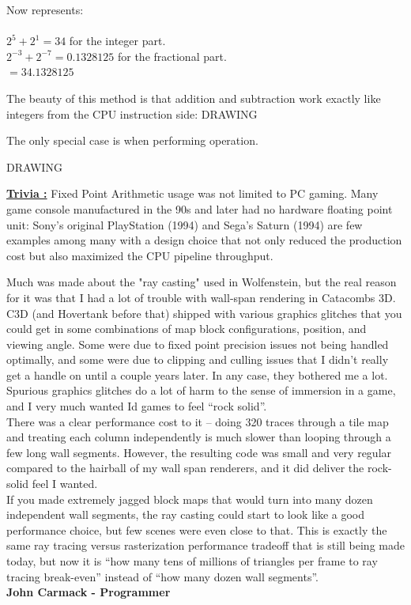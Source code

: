 \documentclass[book.tex]{subfiles}
\begin{document}
Now represents:\\
\\
$ 2^5 + 2^1 = 34 $ for the integer part.\\
$ 2^{-3}+2^{-7} = 0.1328125 $ for the fractional part.\\
$ = 34.1328125$\\

\bigskip

The beauty of this method is that addition and subtraction work exactly like integers from the CPU instruction side:
  \bigskip
  DRAWING
  \bigskip


 The only special case is when performing operation.

\bigskip
  DRAWING
  \bigskip

 \textbf{\underline{Trivia :}}  Fixed Point Arithmetic usage was not limited to PC gaming. Many game console manufactured in the 90s and later had no hardware floating point unit: Sony's original PlayStation (1994) and Sega's Saturn (1994) are few examples among many with a design choice that not only reduced the production cost but also maximized the CPU pipeline throughput.
 
 
 
\begin{fancyquotes}
Much was made about the "ray casting" used in Wolfenstein, but the real reason for it was that I had a lot of trouble with wall-span rendering in Catacombs 3D.  C3D (and Hovertank before that) shipped with various graphics glitches that you could get in some combinations of map block configurations, position, and viewing angle.  Some were due to fixed point precision issues not being handled optimally, and some were due to clipping and culling issues that I didn’t really get a handle on until a couple years later.  In any case, they bothered me a lot.  Spurious graphics glitches do a lot of harm to the sense of immersion in a game, and I very much wanted Id games to feel “rock solid”.
 \bigskip \\
There was a clear performance cost to it – doing 320 traces through a tile map and treating each column independently is much slower than looping through a few long wall segments.  However, the resulting code was small and very regular compared to the hairball of my wall span renderers, and it did deliver the rock-solid feel I wanted.
 \bigskip \\
If you made extremely jagged block maps that would turn into many dozen independent wall segments, the ray casting could start to look like a good performance choice, but few scenes were even close to that.  This is exactly the same ray tracing versus rasterization performance tradeoff that is still being made today, but now it is “how many tens of millions of triangles per frame to ray tracing break-even” instead of “how many dozen wall segments”.
 \bigskip \\
\textbf{John Carmack - Programmer}
 \end{fancyquotes}
 
\end{document}
